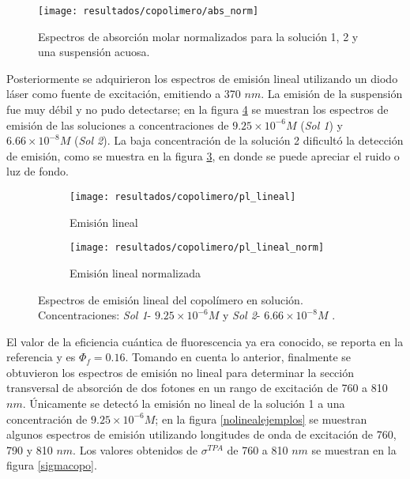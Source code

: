 \begin{figure}[h]
\centering
\texttt{[image: resultados/copolimero/abs\_norm]}
\caption{Espectros de absorci\'on molar normalizados para la soluci\'on 1, 2 y una suspensi\'on acuosa.}\label{absnormalizadita}
\end{figure}

Posteriormente se adquirieron los espectros de emisi\'on lineal utilizando un diodo l\'aser como fuente de excitaci\'on, emitiendo a 370 $nm$. La emisi\'on de la suspensi\'on fue muy d\'ebil y no pudo detectarse; en la figura \ref{copoemilineal} se muestran los espectros de emisi\'on de las soluciones a concentraciones de $9.25 \times 10 ^{-6} M$ (\emph{Sol 1}) y $6.66\times 10^{-8} M$ (\emph{Sol 2}). La baja concentraci\'on de la soluci\'on 2 dificult\'o la detecci\'on de emisi\'on, como se muestra en la figura \ref{emilinnorm}, en donde se puede apreciar el ruido o luz de fondo. 

\begin{figure}[H]
\centering
\begin{subfigure}{0.49\textwidth}
\centering
\texttt{[image: resultados/copolimero/pl\_lineal]}\caption{Emisi\'on lineal}\label{}
\end{subfigure}
\begin{subfigure}{0.47\textwidth}
\centering
\texttt{[image: resultados/copolimero/pl\_lineal\_norm]}\caption{Emisi\'on lineal normalizada}\label{emilinnorm}
\end{subfigure}
\caption{Espectros de emisi\'on lineal del copol\'imero en soluci\'on. Concentraciones: \emph{Sol 1}- $9.25 \times 10 ^{-6} M$ y \emph{Sol 2}- $6.66\times 10^{-8} M$ .}\label{copoemilineal}
\end{figure}

El valor de la eficiencia cu\'antica de fluorescencia ya era conocido, se reporta en la referencia \cite{scherf} y es $\Phi_f=0.16$. Tomando en cuenta lo anterior, finalmente se obtuvieron los espectros de emisi\'on no lineal para determinar la secci\'on transversal de absorci\'on de dos fotones en un rango de excitaci\'on de 760 a 810 $nm$. \'Unicamente se detect\'o la emisi\'on no lineal de la soluci\'on 1 a una concentraci\'on de $9.25 \times 10 ^{-6} M$; en la figura \ref{nolinealejemplos} se muestran algunos espectros de emisi\'on utilizando longitudes de onda de excitaci\'on de 760, 790 y 810 $nm$. Los valores obtenidos de $\sigma ^{TPA}$ de 760 a 810 $nm$ se muestran en la figura \ref{sigmacopo}. 



